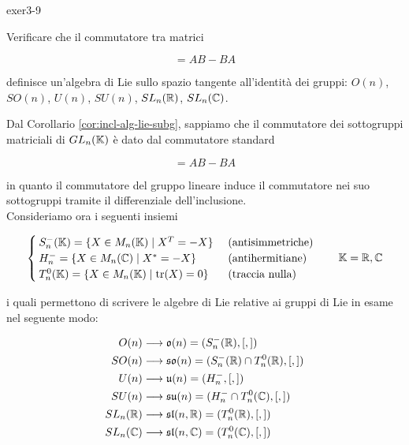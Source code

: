 
{exer3-9}
{
Verificare che il commutatore tra matrici

\begin{equation}
	[A,B] = AB - BA
\end{equation}

definisce un'algebra di Lie sullo spazio tangente all'identità dei gruppi: $ O(n) $, $ SO(n) $, $ U(n) $, $ SU(n) $, $ SL_{n}(\mathbb{R}) $, $ SL_{n}(\mathbb{C}) $.
}
{
Dal Corollario \ref{cor:incl-alg-lie-subg}, sappiamo che il commutatore dei sottogruppi matriciali di $ GL_{n}(\mathbb{K}) $ è dato dal commutatore standard

\begin{equation}
	[A,B] = AB - BA
\end{equation}

in quanto il commutatore del gruppo lineare induce il commutatore nei suo sottogruppi tramite il differenziale dell'inclusione. \\
Consideriamo ora i seguenti insiemi

\begin{equation}
	\begin{cases}
		S^{-}_{n}(\K) = \{ X \in M_{n}(\K) \mid X^{T} = - X \} & \text{ (antisimmetriche)} \\
		H^{-}_{n} = \{ X \in M_{n}(\C) \mid X^{*} = - X \} & \text{ (antihermitiane)} \\
		T^{0}_{n}(\K) = \{ X \in M_{n}(\K) \mid \tr(X) = 0 \} & \text{ (traccia nulla)}
	\end{cases} %
	\qquad \K = \R, \C
\end{equation}

i quali permettono di scrivere le algebre di Lie relative ai gruppi di Lie in esame nel seguente modo:

\begin{align}
	O(n) &\longrightarrow \mathfrak{o}(n) = (S^{-}_{n}(\mathbb{R}),[,]) \\
	SO(n) &\longrightarrow \mathfrak{so}(n) = (S^{-}_{n}(\mathbb{R}) \cap T^{0}_{n}(\mathbb{R}),[,]) \\
	U(n) &\longrightarrow \mathfrak{u}(n) = (H^{-}_{n},[,]) \\
	SU(n) &\longrightarrow \mathfrak{su}(n) = (H^{-}_{n} \cap T^{0}_{n}(\mathbb{C}),[,]) \\
	SL_{n}(\mathbb{R}) &\longrightarrow \mathfrak{sl}(n,\mathbb{R}) = (T^{0}_{n}(\mathbb{R}),[,]) \\
	SL_{n}(\mathbb{C}) &\longrightarrow \mathfrak{sl}(n,\mathbb{C}) = (T^{0}_{n}(\mathbb{C}),[,])
\end{align}

}
